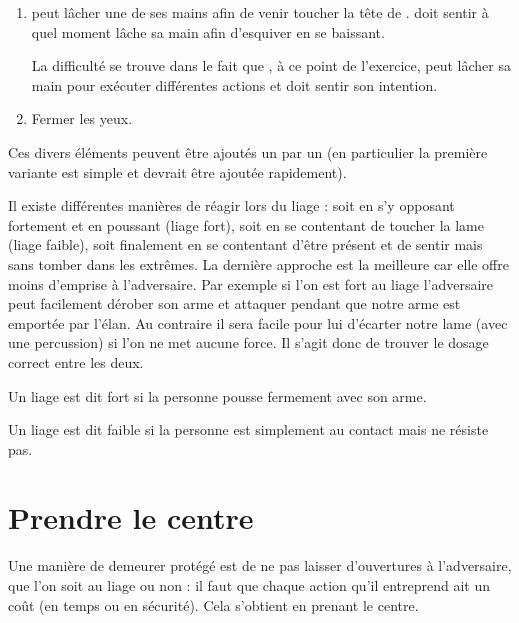 \begin{exercice}
\begin{enumerate}
	\item \A peut lâcher une de ses mains afin de venir toucher la tête de \D.
	\D doit sentir à quel moment \A lâche sa main afin d'esquiver en se baissant.
	
	La difficulté se trouve dans le fait que \A, à ce point de l'exercice, \A peut lâcher sa main pour exécuter différentes actions et \D doit sentir son intention.
	
	\item Fermer les yeux.
\end{enumerate}
Ces divers éléments peuvent être ajoutés un par un (en particulier la première variante est simple et devrait être ajoutée rapidement).

\end{exercice}


Il existe différentes manières de réagir lors du liage : soit en s'y opposant fortement et en poussant (liage fort), soit en se contentant de toucher la lame (liage faible), soit finalement en se contentant d'être présent et de sentir mais sans tomber dans les extrêmes.
La dernière approche est la meilleure car elle offre moins d'emprise à l'adversaire.
Par exemple si l'on est fort au liage l'adversaire peut facilement dérober son arme et attaquer pendant que notre arme est emportée par l'élan.
Au contraire il sera facile pour lui d'écarter notre lame (avec une percussion) si l'on ne met aucune force.
Il s'agit donc de trouver le dosage correct entre les deux.


\begin{definition}

Un liage est dit fort si la personne pousse fermement avec son arme.
\end{definition}


\begin{definition}

Un liage est dit faible si la personne est simplement au contact mais ne résiste pas.
\end{definition}


\section{Prendre le centre}


Une manière de demeurer protégé est de ne pas laisser d'ouvertures à l'adversaire, que l'on soit au liage ou non : il faut que chaque action qu'il entreprend ait un coût (en temps ou en sécurité).
Cela s'obtient en prenant le centre.


